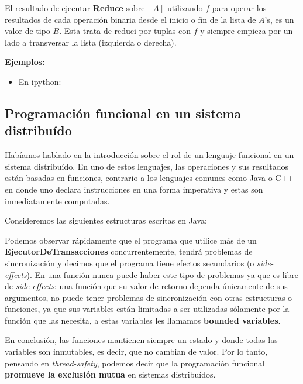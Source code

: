 \documentclass[spanish]{article}
\begin{document}
El resultado de ejecutar \textbf{Reduce} sobre $[A]$ utilizando $f$ para operar los resultados de cada operación binaria desde el inicio o fin de la lista de $A$'s, es un valor de tipo $B$. Esta trata de reduci por tuplas con $f$ y siempre empieza por un lado a transversar la lista (izquierda o derecha). 

\textbf{Ejemplos:}
\begin{itemize}
  \item En ipython:
    
\end{itemize}

\subsection{Programación funcional en un sistema distribuído}
Habíamos hablado en la introducción sobre el rol de un lenguaje funcional en un sistema distribuído. En uno de estos lenguajes, las operaciones y sus resultados están basadas en funciones, contrario a los lenguajes comunes como Java o C++ en donde uno declara instrucciones en una forma imperativa y estas son inmediatamente computadas.

Consideremos las siguientes estructuras escritas en Java:


Podemos observar rápidamente que el programa que utilice más de un \textbf{EjecutorDeTransacciones} concurrentemente, tendrá problemas de sincronización y decimos que el programa tiene efectos secundarios (o \textit{side-effects}). En una función nunca puede haber este tipo de problemas ya que es libre de \textit{side-effects}: una función que su valor de retorno dependa únicamente de sus argumentos, no puede tener problemas de sincronización con otras estructuras o funciones, ya que sus variables están limitadas a ser utilizadas sólamente por la función que las necesita, a estas variables les llamamos \textbf{bounded variables}.

En conclusión, las funciones mantienen siempre un estado y donde todas las variables son inmutables, es decir, que no cambian de valor. Por lo tanto, pensando en \textit{thread-safety}, podemos decir que la programación funcional \textbf{promueve la exclusión mutua} en sistemas distribuídos.
\end{document}
